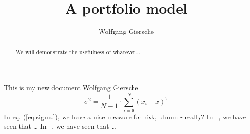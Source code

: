 \documentclass{article}
\title{A portfolio model}
\author{Wolfgang Giersche}
\begin{document}
	\maketitle
	\newpage

	\begin{abstract}
		We will demonstrate the usefulness of whatever...
	\end{abstract}


	This is my new document
	\newpage
	Wolfgang
	\newpage
	Giersche
	\begin{equation}\label{eq:sigma}
	\sigma^2 =\frac{1}{N-1} \cdot \sum_{i=0}^N (x_i - \bar{x}) ^2
	\end{equation}
	In eq. (\ref{eq:sigma}), we have a nice measure for risk, uhmm - really?
	In ~\cite{Tishby2000}, we have seen that \ldots
	In ~\cite{Tishby2000}, we have seen that \ldots

	

\end{document}
